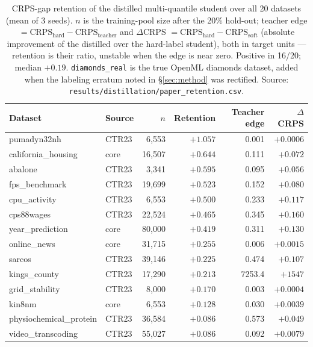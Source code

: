 \documentclass[11pt]{article}
\begin{document}
\begin{table}[t]
\centering
\caption{CRPS-gap retention of the distilled multi-quantile student over
all 20 datasets (mean of 3 seeds). $n$ is the training-pool size after
the 20\% hold-out; teacher edge
$= \mathrm{CRPS}_{\mathrm{hard}} - \mathrm{CRPS}_{\mathrm{teacher}}$
and $\Delta$CRPS
$= \mathrm{CRPS}_{\mathrm{hard}} - \mathrm{CRPS}_{\mathrm{soft}}$
(absolute improvement of the distilled over the hard-label student), both
in target units --- retention is their ratio, unstable when the edge is
near zero. Positive in 16/20; median $+0.19$. \texttt{diamonds\_real} is
the true OpenML diamonds dataset, added when the labeling erratum noted
in \S\ref{sec:method} was rectified. Source:
\texttt{results/\allowbreak distillation/\allowbreak paper\_\allowbreak retention.\allowbreak csv}.}
\label{tab:retention}
\small
\begin{tabular}{llrrrr}
\toprule
Dataset & Source & $n$ & Retention & Teacher edge & $\Delta$CRPS \\
\midrule
pumadyn32nh            & CTR23 & 6{,}553  & $+1.057$ & 0.001 & $+0.0006$ \\
california\_housing    & core  & 16{,}507 & $+0.644$ & 0.111 & $+0.072$ \\
abalone                & CTR23 & 3{,}341  & $+0.595$ & 0.095 & $+0.056$ \\
fps\_benchmark         & CTR23 & 19{,}699 & $+0.523$ & 0.152 & $+0.080$ \\
cpu\_activity          & CTR23 & 6{,}553  & $+0.500$ & 0.233 & $+0.117$ \\
cps88wages             & CTR23 & 22{,}524 & $+0.465$ & 0.345 & $+0.160$ \\
year\_prediction       & core  & 80{,}000 & $+0.419$ & 0.311 & $+0.130$ \\
online\_news           & core  & 31{,}715 & $+0.255$ & 0.006 & $+0.0015$ \\
sarcos                 & CTR23 & 39{,}146 & $+0.225$ & 0.474 & $+0.107$ \\
kings\_county          & CTR23 & 17{,}290 & $+0.213$ & 7253.4 & $+1547$ \\
grid\_stability        & CTR23 & 8{,}000  & $+0.170$ & 0.003 & $+0.0004$ \\
kin8nm                 & core  & 6{,}553  & $+0.128$ & 0.030 & $+0.0039$ \\
physiochemical\_protein& CTR23 & 36{,}584 & $+0.086$ & 0.573 & $+0.049$ \\
video\_transcoding     & CTR23 & 55{,}027 & $+0.086$ & 0.092 & $+0.0079$ \\

\end{tabular}
\end{table}
\end{document}
